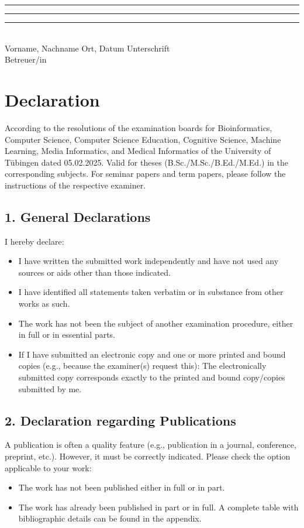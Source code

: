 {        \vspace{1.5cm}
        \noindent
        \rule{5cm}{0.4pt} \hfill \rule{4cm}{0.4pt} \hfill \rule{5cm}{0.4pt} \\
        Vorname, Nachname \hfill Ort, Datum \hfill Unterschrift \\
        Betreuer/in
    \else
        \section*{Declaration}
        \small
        According to the resolutions of the examination boards for Bioinformatics, Computer Science, Computer Science Education, Cognitive Science, Machine Learning, Media Informatics, and Medical Informatics of the University of Tübingen dated 05.02.2025. Valid for theses (B.Sc./M.Sc./B.Ed./M.Ed.) in the corresponding subjects. For seminar papers and term papers, please follow the instructions of the respective examiner.

        \subsection*{1. General Declarations}
        I hereby declare:
        \begin{itemize}
            \item I have written the submitted work independently and have not used any sources or aids other than those indicated.
            \item I have identified all statements taken verbatim or in substance from other works as such.
            \item The work has not been the subject of another examination procedure, either in full or in essential parts.
            \item If I have submitted an electronic copy and one or more printed and bound copies (e.g., because the examiner(s) request this): The electronically submitted copy corresponds exactly to the printed and bound copy/copies submitted by me.
        \end{itemize}

        \subsection*{2. Declaration regarding Publications}
        A publication is often a quality feature (e.g., publication in a journal, conference, preprint, etc.). However, it must be correctly indicated. Please check the option applicable to your work:
        \begin{itemize}
            \item[$\square$] The work has not been published either in full or in part.
            \item[$\square$] The work has already been published in part or in full. A complete table with bibliographic details can be found in the appendix.
        \end{itemize}

}
